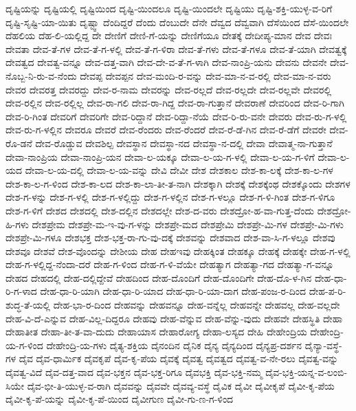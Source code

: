 {ದೃಷ್ಟಿಯನ್ನು
ದೃಷ್ಟಿಯಲ್ಲಿ
ದೃಷ್ಟಿಯಿಂದ
ದೃಷ್ಟಿ-ಯಿಂದಲೂ
ದೃಷ್ಟಿ-ಯಿಂದಲೇ
ದೃಷ್ಟಿಯು
ದೃಷ್ಟಿ-ಶಕ್ತಿ-ಯುಳ್ಳ-ವ-ರಿಗೆ
ದೃಷ್ಟಿ-ಸೃಷ್ಟಿ-ಯಾ-ಯಿತು
ದೃಷ್ಟ್ವಾ
ದೆಂದಿದ್ದರೆ
ದೆಂದು
ದೆಂಬುದೇ
ದೆನೇ
ದೆವ್ವದ
ದೆವ್ವವಾಗಿ
ದೆಸೆಯಿಂದ
ದೆಸೆ-ಯಿಂದಲೇ
ದೆಹಲಿಯ
ದೆಹ-ಲಿ-ಯಲ್ಲಿದ್ದ
ದೇ
ದೇಣಿಗೆ
ದೇಣಿ-ಗೆ-ಯನ್ನು
ದೇಣಿಗೆಯೂ
ದೇತಕ್ಕೆ
ದೇದೀಪ್ಯ-ಮಾನ
ದೇವ
ದೇವಃ
ದೇವತಾ
ದೇವ-ತೆ-ಗಳ
ದೇವ-ತೆ-ಗ-ಳಲ್ಲಿ
ದೇವ-ತೆ-ಗ-ಳಿರಾ
ದೇವ-ತೆ-ಗಳು
ದೇವ-ತೆ-ಗಳೂ
ದೇವ-ತೆ-ಯಾಗಿ
ದೇವತ್ವಕ್ಕೆ
ದೇವತ್ವದ
ದೇವತ್ವ-ವನ್ನೂ
ದೇವ-ದತ್ತ-ವಾಗಿ
ದೇವ-ದೇ-ವ-ತೆ-ಗ-ಳಾಗಿ
ದೇವ-ನಾಂಪ್ರಿ-ಯನು
ದೇವನು
ದೇವನೇ
ದೇವ-ನೊಬ್ಬ-ನಿ-ರು-ವ-ನೆಂದು
ದೇವಪ್ಪ
ದೇವಪ್ಪನ
ದೇವ-ಮಂದಿ-ರ-ವನ್ನು
ದೇವ-ಮಾ-ನ-ವ-ರಲ್ಲಿ
ದೇವ-ಮಾ-ನ-ವರು
ದೇವರ
ದೇವರತ್ತ
ದೇವರದ್ದು
ದೇವ-ರ-ನಾಮ
ದೇವರನ್ನು
ದೇವ-ರಲ್ಲದೆ
ದೇವ-ರಲ್ಲದೇ
ದೇವ-ರಲ್ಲವೇ
ದೇವರಲ್ಲಿ
ದೇವ-ರಲ್ಲಿನ
ದೇವ-ರಲ್ಲಿಲ್ಲ
ದೇವ-ರಾ-ಗಲಿ
ದೇವ-ರಾ-ಗಿದ್ದ
ದೇವ-ರಾ-ಗುತ್ತಾನೆ
ದೇವರಾಣೆ
ದೇವರಿಂದ
ದೇವ-ರಿ-ಗಾಗಿ
ದೇವ-ರಿ-ಗಿಂತ
ದೇವರಿಗೆ
ದೇವರಿಗೇ
ದೇವ-ರಿದ್ದಾನೆ
ದೇವ-ರಿದ್ದಾ-ನೆಯೆ
ದೇವ-ರಿ-ರು-ವನೇ
ದೇವರು
ದೇವ-ರು-ಗ-ಳಲ್ಲಿ
ದೇವ-ರು-ಗ-ಳಲ್ಲಿನ
ದೇವರೂ
ದೇವರೆ
ದೇವ-ರೆಂದರು
ದೇವ-ರೆಂದರೆ
ದೇವ-ರೆ-ಡೆ-ಗಿನ
ದೇವ-ರೆ-ಡೆಗೆ
ದೇವರೇ
ದೇವ-ರೊ-ಡನೆ
ದೇವ-ರೊಡ್ಡುವ
ದೇವಶಿಲ್ಪ
ದೇವಸ್ಥಾನ
ದೇವಸ್ಥಾ-ನದ
ದೇವಸ್ಥಾ-ನ-ದಲ್ಲಿ
ದೇವಾ
ದೇವಾತ್ಮ-ನಾ-ಗುತ್ತಾನೆ
ದೇವಾ-ನಾಂಪ್ರಿಯ
ದೇವಾ-ನಾಂಪ್ರಿ-ಯನ
ದೇವಾ-ಲ-ಯಕ್ಕೂ
ದೇವಾ-ಲ-ಯ-ಗ-ಳಲ್ಲಿ
ದೇವಾ-ಲ-ಯ-ಗ-ಳಿಗೆ
ದೇವಾ-ಲ-ಯದ
ದೇವಾ-ಲ-ಯ-ದಲ್ಲಿ
ದೇವಾ-ಲ-ಯ-ವನ್ನು
ದೇವಿ
ದೇವೀ
ದೇಶ
ದೇಶಕಾಲ
ದೇಶ-ಕಾ-ಲಕ್ಕೆ
ದೇಶ-ಕಾ-ಲ-ಗಳ
ದೇಶ-ಕಾ-ಲ-ಗ-ಳಿಂದ
ದೇಶ-ಕಾ-ಲದ
ದೇಶ-ಕಾ-ಲಾ-ತೀ-ತ-ನಾಗಿ
ದೇಶಕ್ಕಾಗಿ
ದೇಶಕ್ಕೆ
ದೇಶಕ್ಕೆಂಥ
ದೇಶಕ್ಕೊಂದು
ದೇಶಗಳ
ದೇಶ-ಗ-ಳನ್ನು
ದೇಶ-ಗ-ಳಲ್ಲಿ
ದೇಶ-ಗ-ಳಲ್ಲಿದ್ದು
ದೇಶ-ಗ-ಳಲ್ಲಿನ
ದೇಶ-ಗ-ಳಲ್ಲೂ
ದೇಶ-ಗ-ಳಿ-ಗಿಂತ
ದೇಶ-ಗ-ಳಿಗೂ
ದೇಶ-ಗ-ಳಿಗೆ
ದೇಶದ
ದೇಶದಲ್ಲಿ
ದೇಶ-ದಲ್ಲಿನ
ದೇಶದಲ್ಲೇ
ದೇಶ-ದ-ವರು
ದೇಶದ್ರೋ-ಹ-ವಾ-ಗುತ್ತ-ದೆಂದು
ದೇಶದ್ರೋ-ಹಿ-ಗಳು
ದೇಶಪ್ರೇಮ
ದೇಶಪ್ರೇ-ಮ-ಇ-ವು-ಗ-ಳನ್ನು
ದೇಶಪ್ರೇ-ಮದ
ದೇಶಪ್ರೇಮಿ
ದೇಶಪ್ರೇ-ಮಿ-ಗಳ
ದೇಶಪ್ರೇ-ಮಿ-ಗಳು
ದೇಶಪ್ರೇ-ಮಿ-ಗಳೂ
ದೇಶಭಕ್ತ
ದೇಶ-ಭಕ್ತ-ರಾ-ಗು-ವು-ದಕ್ಕೆ
ದೇಶವನ್ನು
ದೇಶವಾದ
ದೇಶ-ವಾ-ಸಿ-ಗ-ಳಲ್ಲೂ
ದೇಶವು
ದೇಶವೂ
ದೇಶವೆ
ದೇಶ-ವೊಂದನ್ನು
ದೇಶೀಯ
ದೇಹ
ದೇಹಇವು
ದೇಹಕ್ಕಿಂತ
ದೇಹಕ್ಕೂ
ದೇಹಕ್ಕೆ
ದೇಹಕ್ಕೇ
ದೇಹ-ಗ-ಳಲ್ಲಿ
ದೇಹ-ಗ-ಳಲ್ಲಿದ್ದ-ನೆಂದಾ-ದರೆ
ದೇಹ-ಗ-ಳಿಂದ
ದೇಹ-ಗ-ಳಿ-ವೆಯೇ
ದೇಹತ್ಯಾಗ
ದೇಹತ್ಯಾ-ಗದ
ದೇಹತ್ಯಾ-ಗ-ವನ್ನೂ
ದೇಹದ
ದೇಹದಲ್ಲಿ
ದೇಹ-ದಲ್ಲಿದ್ದೇವೆ
ದೇಹದಿಂದ
ದೇಹ-ದೊಂದಿಗೆ
ದೇಹ-ದೊಂದಿಗೇ
ದೇಹ-ದೊ-ಳ-ಗಿನ
ದೇಹ-ಧಾ-ರಿ-ಗ-ಳಾದ
ದೇಹ-ಧಾ-ರಿ-ಯಾಗಿ
ದೇಹ-ಧಾ-ರಿ-ಯಾದ
ದೇಹ-ಧಾ-ರಿ-ಯಾ-ದಾಗ
ದೇಹ-ಪಂಜ-ರ-ದಿಂದ
ದೇಹ-ಪ-ರಿ-ಶುದ್ಧ-ತೆ-ಯಲ್ಲಿ
ದೇಹ-ಭಾ-ರ-ದಿಂದ
ದೇಹವನ್ನು
ದೇಹವನ್ನೂ
ದೇಹ-ವನ್ನೆಲ್ಲ
ದೇಹವನ್ನೇ
ದೇಹವಲ್ಲ
ದೇಹ-ವಲ್ಲದೇ
ದೇಹ-ವಿ-ದೆ-ಎನ್ನುವ
ದೇಹ-ವಿಲ್ಲ-ದಿದ್ದರೂ
ದೇಹವು
ದೇಹ-ವೆನ್ನುವ
ದೇಹ-ವೆನ್ನು-ವುದು
ದೇಹವೇ
ದೇಹಸ್ಥಿತಿ
ದೇಹಾ
ದೇಹಾತೀತ
ದೇಹಾ-ತೀ-ತ-ವಾ-ದುದು
ದೇಹಾಯಾಸ
ದೇಹಾರೋಗ್ಯ
ದೇಹಾ-ಲಸ್ಯದ
ದೇಹಿ
ದೇಹೇಂದ್ರಿಯ
ದೇಹೇಂದ್ರಿ-ಯ-ಗ-ಳಿಂದ
ದೇಹೇಂದ್ರಿ-ಯ-ಗಳು
ದೈತ್ಯ-ಶಕ್ತಿಯ
ದೈನಂದಿನ
ದೈನಿಕ
ದೈನ್ಯ
ದೈನ್ಯದಿಂದ
ದೈನ್ಯಪ್ರ-ದರ್ಶನ
ದೈನ್ಯಾ-ವಸ್ಥೆ-ಗಳ
ದೈವ
ದೈವ-ಧಾರ್ಮಿಕ
ದೈವಕೃಪೆ
ದೈವ-ಕೃ-ಪೆಯ
ದೈವಕ್ಕೆ
ದೈವತ್ವ
ದೈವತ್ವದ
ದೈವತ್ವ-ವ-ನೇ-ರಲು
ದೈವತ್ವ-ವನ್ನು
ದೈವತ್ವ-ವಿದೆ
ದೈವ-ದತ್ತ-ವಾದ
ದೈವ-ಭಕ್ತನ
ದೈವ-ಭಕ್ತ-ರಿಗೂ
ದೈವಭಕ್ತಿ
ದೈವ-ಭಕ್ತಿ-ನಮ್ಮ
ದೈವ-ಭಕ್ತಿ-ಯನ್ನ-ವ-ಲಂಬಿ-ಸಿಯೇ
ದೈವ-ಭೀ-ತಿ-ಯುಳ್ಳ-ವ-ರಾಗಿ
ದೈವವನ್ನು
ದೈವವೇ
ದೈವವ್ಯ-ವಸ್ಥೆ
ದೈವಿಕ
ದೈವೀ
ದೈವೀಕೃಪೆ
ದೈವೀ-ಕೃ-ಪೆಯ
ದೈವೀ-ಕೃ-ಪೆ-ಯನ್ನು
ದೈವೀ-ಕೃ-ಪೆ-ಯಿಂದ
ದೈವೀಗುಣ
ದೈವೀ-ಗು-ಣ-ಗ-ಳಿಂದ
}
